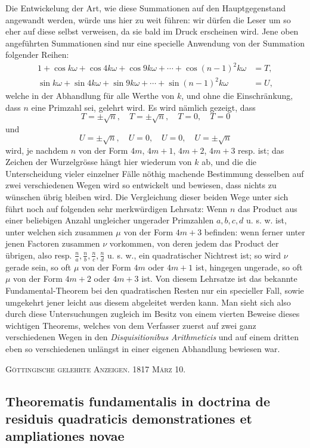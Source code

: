 \documentclass[12pt]{article}
\begin{document}
Die Entwickelung der Art, wie diese Summationen auf den Hauptgegenstand angewandt werden, würde uns hier zu weit führen: wir dürfen die Leser um so eher auf diese selbst verweisen, da sie bald im Druck erscheinen wird. Jene oben angeführten Summationen sind nur eine specielle Anwendung von der Summation folgender Reihen:
\begin{align*}
1+\cos k\omega+\cos 4k\omega+\cos 9k\omega+\cdots+\cos (n-1)^2k\omega&=T,\\
\sin k\omega+\sin 4k\omega+\sin 9k\omega+\cdots+\sin (n-1)^2k\omega&=U,
\end{align*}
welche in der Abhandlung für alle Werthe von $k$, und ohne die Einschränkung, dass $n$ eine Primzahl sei, gelehrt wird. Es wird nämlich gezeigt, dass
\[
T=\pm\sqrt n,\quad T=\pm\sqrt n,
\quad T=0,
\quad T=0
\]
und
\[
U=\pm\sqrt n,
\quad U=0,
\quad U=0,
\quad U=\pm\sqrt n
\]
wird, je nachdem $n$ von der Form $4m$, $4m+1$, $4m+2$, $4m+3$ resp. ist; das Zeichen der Wurzelgrösse hängt hier wiederum von $k$ ab, und die die Unterscheidung vieler einzelner Fälle nöthig machende Bestimmung desselben auf zwei verschiedenen Wegen wird so entwickelt und bewiesen, dass nichts zu wünschen übrig bleiben wird. Die Vergleichung dieser beiden Wege unter sich führt noch auf folgenden sehr merkwürdigen Lehrsatz: Wenn $n$ das Product aus einer beliebigen Anzahl ungleicher ungerader Primzahlen $a,b,c,d$ u. s. w. ist, unter welchen sich zusammen $\mu$ von der Form $4m+3$ befinden: wenn ferner unter jenen Factoren zusammen $\nu$ vorkommen, von deren jedem das Product der übrigen, also resp. $\frac na,\frac nb,\frac nc,\frac nd$ u. s. w., ein quadratischer Nichtrest ist; so wird $\nu$ gerade sein, so oft $\mu$ von der Form $4m$ oder $4m+1$ ist, hingegen ungerade, so oft $\mu$ von der Form $4m+2$ oder $4m+3$ ist. Von diesem Lehrsatze ist das bekannte Fundamental-Theorem bei den quadratischen Resten nur ein specieller Fall, sowie umgekehrt jener leicht aus diesem abgeleitet werden kann. Man sieht sich also durch diese Untersuchungen zugleich im Besitz von einem vierten Beweise dieses wichtigen Theorems, welches von dem Verfasser zuerst auf zwei ganz verschiedenen Wegen in den \textit{Disquisitionibus Arithmeticis} und auf einem dritten eben so verschiedenen unlängst in einer eigenen Abhandlung bewiesen war.

\begin{center}
\textsc{Göttingische gelehrte Anzeigen. 1817 März 10.}
\end{center}

\subsection*{Theorematis fundamentalis in doctrina de residuis quadraticis demonstrationes et ampliationes novae}
\end{document}
